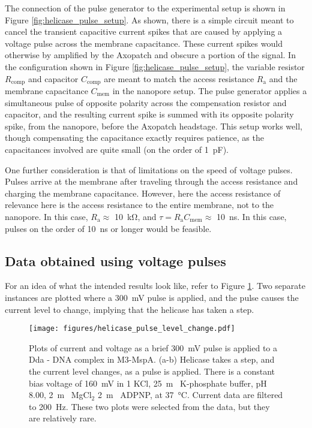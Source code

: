 The connection of the pulse generator to the experimental setup is shown in Figure \ref{fig:helicase_pulse_setup}.  As shown, there is a simple circuit meant to cancel the transient capacitive current spikes that are caused by applying a voltage pulse across the membrane capacitance.  These current spikes would otherwise by amplified by the Axopatch and obscure a portion of the signal.  In the configuration shown in Figure \ref{fig:helicase_pulse_setup}, the variable resistor $R_{\text{comp}}$ and capacitor $C_{\text{comp}}$ are meant to match the access resistance $R_{\text{a}}$ and the membrane capacitance $C_{\text{mem}}$ in the nanopore setup.  The pulse generator applies a simultaneous pulse of opposite polarity across the compensation resistor and capacitor, and the resulting current spike is summed with its opposite polarity spike, from the nanopore, before the Axopatch headstage.  This setup works well, though compensating the capacitance exactly requires patience, as the capacitances involved are quite small (on the order of \SI{1}{\pico\F}).

One further consideration is that of limitations on the speed of voltage pulses.  Pulses arrive at the membrane after traveling through the access resistance and charging the membrane capacitance.  However, here the access resistance of relevance here is the access resistance to the entire membrane, not to the nanopore.  In this case, $R_{\text{a}} \approx $ \SI{10}{\kilo\ohm}, and $\tau = R_{\text{a}} C_{\text{mem}} \approx $ \SI{10}{\ns}.  In this case, pulses on the order of \SI{10}{\ns} or longer would be feasible.

\subsection{Data obtained using voltage pulses}

For an idea of what the intended results look like, refer to Figure \ref{fig:helicase_pulse}.  Two separate instances are plotted where a \SI{300}{\mV} pulse is applied, and the pulse causes the current level to change, implying that the helicase has taken a step.

\begin{figure}[h]
\begin{centering}
\texttt{[image: figures/helicase\_pulse\_level\_change.pdf]}
\caption[Voltage pulse can induce a helicase step]{Plots of current and voltage as a brief \SI{300}{\mV} pulse is applied to a Dda - DNA complex in  M3-MspA.  (a-b) Helicase takes a step, and the current level changes, as a pulse is applied.  There is a constant bias voltage of \SI{160}{\mV} in \SI{1}{\Molar} KCl, \SI{25}{\m\Molar} K-phosphate buffer, pH \num{8.00}, \SI{2}{\m\Molar} MgCl$_2$ \SI{2}{\m\Molar} ADPNP, at \SI{37}{\celsius}.  Current data are filtered to \SI{200}{\Hz}.  These two plots were selected from the data, but they are relatively rare.}
\label{fig:helicase_pulse}
\end{centering}
\end{figure}


